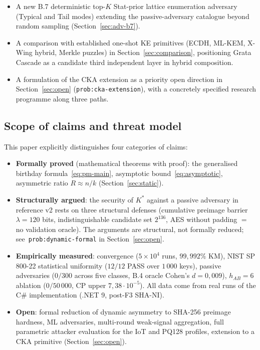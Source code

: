 \documentclass[11pt,a4paper]{article}
\begin{document}
\begin{itemize}[leftmargin=*]
\item A new B.7 deterministic top-$K$ Stat-prior lattice enumeration adversary (Typical and Tail modes) extending the passive-adversary catalogue beyond random sampling (Section~\ref{sec:adv-b7}).
\item A comparison with established one-shot KE primitives (ECDH, ML-KEM, X-Wing hybrid, Merkle puzzles) in Section~\ref{sec:comparison}, positioning Grata Cascade as a candidate third independent layer in hybrid composition.
\item A formulation of the CKA extension as a priority open direction in Section~\ref{sec:open} (\texttt{prob:cka-extension}), with a concretely specified research programme along three paths.
\end{itemize}

\subsection{Scope of claims and threat model}\label{sec:scope}

This paper explicitly distinguishes four categories of claims:
\begin{itemize}[leftmargin=*]
\item \textbf{Formally proved} (mathematical theorems with proof): the generalised birthday formula~\eqref{eq:pm-main}, asymptotic bound~\eqref{eq:asymptotic}, asymmetric ratio $R \approx n/k$ (Section~\ref{sec:static}).
\item \textbf{Structurally argued}: the security of $K^*$ against a passive adversary in reference v2 rests on three structural defenses (cumulative preimage barrier $\lambda = 120$ bits, indistinguishable candidate set $2^{136}$, AES without padding $=$ no validation oracle). The arguments are structural, not formally reduced; see~\texttt{prob:dynamic-formal} in Section~\ref{sec:open}.
\item \textbf{Empirically measured}: convergence ($5 \times 10^4$ runs, $99{,}992\%$ KM), NIST SP 800-22 statistical uniformity ($12/12$ PASS over $1\,000$ keys), passive adversaries ($0/300$ across five classes, B.4 oracle Cohen's $d = 0{,}009$), $h_{AB} = 6$ ablation ($0/50\,000$, CP upper $7{,}38 \cdot 10^{-5}$). All data come from real runs of the C\# implementation (.NET 9, post-F3 SHA-NI).
\item \textbf{Open}: formal reduction of dynamic asymmetry to SHA-256 preimage hardness, ML adversaries, multi-round weak-signal aggregation, full parametric attacker evaluation for the IoT and PQ128 profiles, extension to a CKA primitive (Section~\ref{sec:open}).
\end{itemize}
\end{document}

